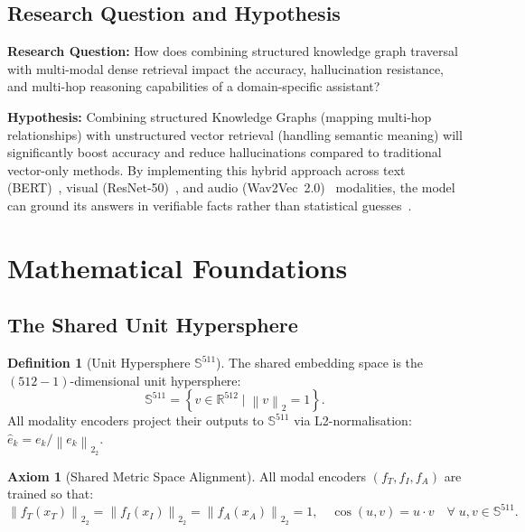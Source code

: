 \documentclass[12pt,a4paper]{article}
\theoremstyle{definition}
\newtheorem{definition}{Definition}[section]
\newtheorem{axiom}{Axiom}[section]
\theoremstyle{plain}
\theoremstyle{remark}
\newcommand{\R}{\mathbb{R}}
\newcommand{\Sph}{\mathbb{S}}
\newcommand{\Norm}[1]{\left\|#1\right\|_2}
\begin{document}
\subsection{Research Question and Hypothesis}

\noindent\textbf{Research Question:} How does combining structured knowledge graph traversal with multi-modal dense retrieval impact the accuracy, hallucination resistance, and multi-hop reasoning capabilities of a domain-specific assistant?

\noindent\textbf{Hypothesis:} Combining structured Knowledge Graphs (mapping multi-hop relationships) with unstructured vector retrieval (handling semantic meaning) will significantly boost accuracy and reduce hallucinations compared to traditional vector-only methods. By implementing this hybrid approach across text (BERT)~\cite{devlin2019bert}, visual (ResNet-50)~\cite{he2016deep}, and audio (Wav2Vec~2.0)~\cite{baevski2020wav2vec} modalities, the model can ground its answers in verifiable facts rather than statistical guesses~\cite{kadam2022multimodal}.

\newpage
\section{Mathematical Foundations}
\label{sec:math}

\subsection{The Shared Unit Hypersphere}

\begin{definition}[Unit Hypersphere $\Sph^{511}$]
The shared embedding space is the $(512{-}1)$-dimensional unit hypersphere:
\[
  \Sph^{511} = \left\{v \in \R^{512} \;\Big|\; \Norm{v} = 1\right\}.
\]
All modality encoders project their outputs to $\Sph^{511}$ via L2-normalisation: $\hat{e}_k = e_k / \Norm{e_k}_2$.
\end{definition}

\begin{axiom}[Shared Metric Space Alignment]
All modal encoders $(f_T, f_I, f_A)$ are trained so that:
\[
  \Norm{f_T(x_T)}_2 = \Norm{f_I(x_I)}_2 = \Norm{f_A(x_A)}_2 = 1, \quad
  \cos(u,v) = u \cdot v \quad \forall\; u,v \in \Sph^{511}.
\]
\end{axiom}
\end{document}
